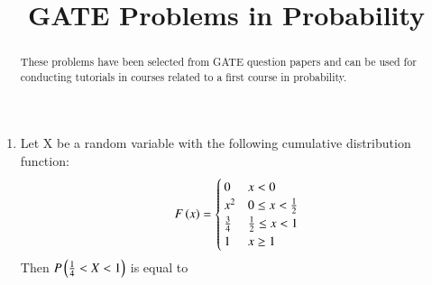\documentclass[journal,12pt,twocolumn]{IEEEtran}
\begin{document}
\title{
GATE Problems in Probability
}

\maketitle

\begin{abstract}
These problems have been selected from GATE question papers and can be used for conducting tutorials in courses related to a first course in probability.
\end{abstract}

\begin{enumerate}
\setlength\itemsep{2em}

\item Let X be a random variable with the following cumulative distribution function:
\begin{align}
F\left(x\right) 
= 
\begin{cases}
0           & x < 0 \\
x^2         & 0 \leq x < \frac{1}{2} \\
\frac{3}{4} & \frac{1}{2} \leq x < 1 \\
1           &  x \geq 1 
\end{cases}
\end{align}
Then $ P\left(\frac{1}{4} < X < 1\right)$ is equal to


\end{enumerate}
\end{document}
